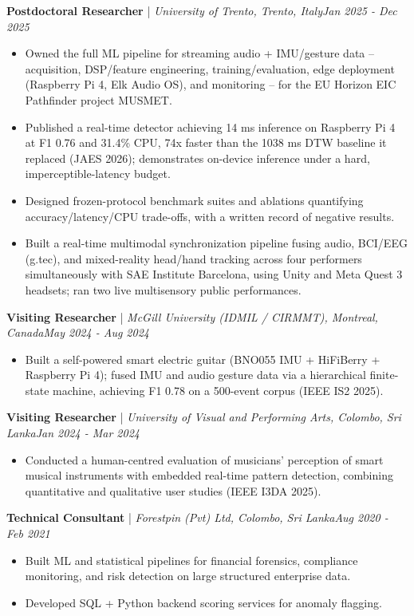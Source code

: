 \documentclass[11pt]{article}
\newenvironment{cvrole}[5]{%
  \par\noindent\textbf{\large #1} | \textit{\small #2, #3}\hfill \textit{\small #4 - #5}\par
  \begin{itemize}[leftmargin=2em, itemsep=-0.3em, topsep=-0.5em]%
}{%
  \end{itemize}\par\noindent\mbox{}\par\vspace{0.1em}%
}
\begin{document}
\begin{cvrole}{Postdoctoral Researcher}{University of Trento}{Trento, Italy}{Jan 2025}{Dec 2025}
    \item Owned the full ML pipeline for streaming audio + IMU/gesture data -- acquisition, DSP/feature engineering, training/evaluation, edge deployment (Raspberry Pi 4, Elk Audio OS), and monitoring -- for the EU Horizon EIC Pathfinder project MUSMET.
    \item Published a real-time detector achieving 14 ms inference on Raspberry Pi 4 at F1 0.76 and 31.4\% CPU, 74x faster than the 1038 ms DTW baseline it replaced (JAES 2026); demonstrates on-device inference under a hard, imperceptible-latency budget.
    \item Designed frozen-protocol benchmark suites and ablations quantifying accuracy/latency/CPU trade-offs, with a written record of negative results.
    \item Built a real-time multimodal synchronization pipeline fusing audio, BCI/EEG (g.tec), and mixed-reality head/hand tracking across four performers simultaneously with SAE Institute Barcelona, using Unity and Meta Quest 3 headsets; ran two live multisensory public performances.
\end{cvrole}

\begin{cvrole}{Visiting Researcher}{McGill University (IDMIL / CIRMMT)}{Montreal, Canada}{May 2024}{Aug 2024}
    \item Built a self-powered smart electric guitar (BNO055 IMU + HiFiBerry + Raspberry Pi 4); fused IMU and audio gesture data via a hierarchical finite-state machine, achieving F1 0.78 on a 500-event corpus (IEEE IS2 2025).
\end{cvrole}

\begin{cvrole}{Visiting Researcher}{University of Visual and Performing Arts}{Colombo, Sri Lanka}{Jan 2024}{Mar 2024}
    \item Conducted a human-centred evaluation of musicians' perception of smart musical instruments with embedded real-time pattern detection, combining quantitative and qualitative user studies (IEEE I3DA 2025).
\end{cvrole}

\begin{cvrole}{Technical Consultant}{Forestpin (Pvt) Ltd}{Colombo, Sri Lanka}{Aug 2020}{Feb 2021}
    \item Built ML and statistical pipelines for financial forensics, compliance monitoring, and risk detection on large structured enterprise data.
    \item Developed SQL + Python backend scoring services for anomaly flagging.
\end{cvrole}
\end{document}
